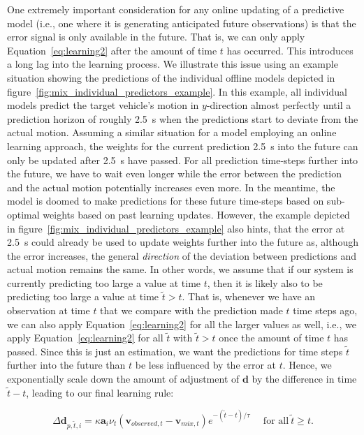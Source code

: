 One extremely important consideration for any online updating of a predictive model (i.e., one where it is generating anticipated future observations) is that the error signal is only available in the future.
That is, we can only apply Equation~\eqref{eq:learning2} after the amount of time $t$ has occurred.  
This introduces a long lag into the learning process.  
We illustrate this issue using an example situation showing the predictions of the individual offline models depicted in figure~\ref{fig:mix_individual_predictors_example}.
In this example, all individual models predict the target vehicle's motion in $y$-direction almost perfectly until a prediction horizon of roughly \SI{2.5}{\second} when the predictions start to deviate from the actual motion.
Assuming a similar situation for a model employing an online learning approach, the weights for the current prediction \SI{2.5}{\second} into the future can only be updated after \SI{2.5}{\second} have passed. 
For all prediction time-steps further into the future, we have to wait even longer while the error between the prediction and the actual motion potentially increases even more.
In the meantime, the model is doomed to make predictions for these future time-steps based on sub-optimal weights based on past learning updates.
However, the example depicted in figure~\ref{fig:mix_individual_predictors_example} also hints, that the error at \SI{2.5}{\second} could already be used to update weights further into the future as, although the error increases, the general \emph{direction} of the deviation between predictions and actual motion remains the same. 
In other words, we assume that if our system is currently predicting too large a value at time $t$, then it is likely also to be predicting too large a value at time $ \tilde{t} > t$.
That is, whenever we have an observation at time $t$ that we compare with the prediction made $t$ time steps ago, we can also apply Equation~\eqref{eq:learning2} for all the larger values as well, i.e., we apply Equation~\eqref{eq:learning2} for all $ \tilde{t}$ with $ \tilde{t} > t$ once the amount of time $t$ has passed.
Since this is just an estimation, we want the predictions for time steps $ \tilde{t} $ further into the future than $t$ be less influenced by the error at $t$.
Hence, we exponentially scale down the amount of adjustment of $\mathbf{d}$ by the difference in time $ \tilde{t}-t$, leading to our final learning rule:

\begin{equation}
  \Delta\mathbf{d}_{p, \tilde{t} ,i} = \kappa \mathbf{a}_i \nu_{t} (\mathbf{v}_{observed,t}-\mathbf{v}_{mix,t}) e^{-{( \tilde{t} - t)}/\tau}~~~~~~ \textrm{for all}~ \tilde{t}  \geq t.
  \label{eq:learning3}
\end{equation}

